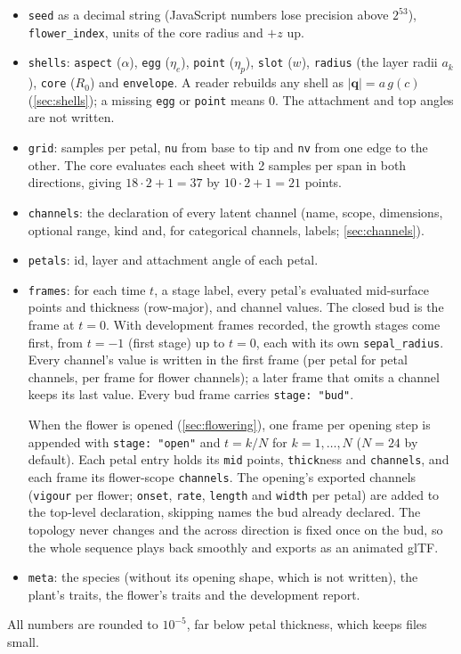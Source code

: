 \begin{itemize}[leftmargin=*]
\item \texttt{seed} as a decimal string (JavaScript numbers lose precision
  above $2^{53}$), \texttt{flower\_index}, units of the core radius and $+z$
  up.
\item \texttt{shells}: \texttt{aspect} ($\alpha$), \texttt{egg} ($\eta_e$),
  \texttt{point} ($\eta_p$), \texttt{slot} ($w$), \texttt{radius} (the layer
  radii $a_k$), \texttt{core} ($R_0$) and \texttt{envelope}. A reader rebuilds
  any shell as $|\mathbf q| = a\,g(c)$ (\cref{sec:shells}); a missing
  \texttt{egg} or \texttt{point} means 0. The attachment and top angles are
  not written.
\item \texttt{grid}: samples per petal, \texttt{nu} from base to tip and
  \texttt{nv} from one edge to the other. The core evaluates each sheet with
  2 samples per span in both directions, giving $18\cdot2+1 = 37$ by
  $10\cdot2+1 = 21$ points.
\item \texttt{channels}: the declaration of every latent channel (name, scope,
  dimensions, optional range, kind and, for categorical channels, labels;
  \cref{sec:channels}).
\item \texttt{petals}: id, layer and attachment angle of each petal.
\item \texttt{frames}: for each time $t$, a stage label, every petal's
  evaluated mid-surface points and thickness (row-major), and channel values.
  The closed bud is the frame at $t=0$. With development frames recorded, the
  growth stages come first, from $t=-1$ (first stage) up to $t=0$, each with
  its own \texttt{sepal\_radius}. Every channel's value is written in the first
  frame (per petal for petal channels, per frame for flower channels); a later
  frame that omits a channel keeps its last value. Every bud frame carries
  \texttt{stage: "bud"}.

  When the flower is opened (\cref{sec:flowering}), one frame per opening
  step is appended with \texttt{stage: "open"} and $t = k/N$ for
  $k = 1,\dots,N$ ($N = 24$ by default). Each petal entry holds its
  \texttt{mid} points, \texttt{thick}ness and \texttt{channels}, and each frame
  its flower-scope \texttt{channels}. The opening's exported channels
  (\texttt{vigour} per flower; \texttt{onset}, \texttt{rate},
  \texttt{length} and \texttt{width} per petal) are added to the top-level
  declaration, skipping names the bud already declared. The topology never
  changes and the across direction is fixed once on the bud, so the whole
  sequence plays back smoothly and exports as an animated glTF.
\item \texttt{meta}: the species (without its opening shape, which is not
  written), the plant's traits, the flower's traits and the development
  report.
\end{itemize}
All numbers are rounded to $10^{-5}$, far below petal
thickness, which keeps files small.

